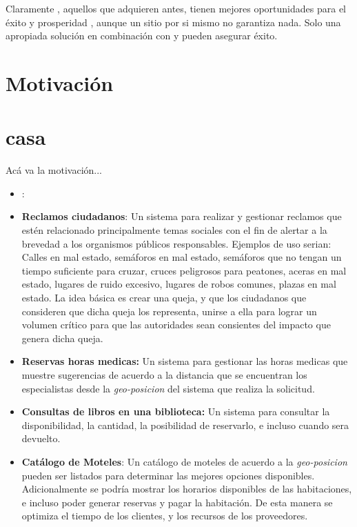 Claramente , aquellos que adquieren \estores antes, tienen mejores oportunidades  para el éxito y prosperidad , aunque un sitio \ecommerce por si mismo no garantiza nada. Solo una apropiada solución \ecommerce en combinación con \emarketing y \advertising pueden asegurar éxito.


\section{Motivación}\label{cap:intro:motivacion}
\section{casa}

Acá va la motivación...

\begin{itemize}
	\item \textbf{\shoppingcart}:
	
	\item \textbf{Reclamos ciudadanos}: Un sistema para realizar y gestionar reclamos que estén relacionado principalmente temas sociales con el fin de alertar a la brevedad a los organismos públicos responsables. Ejemplos de uso serian: Calles en mal estado, semáforos en mal estado, semáforos que no tengan un tiempo suficiente para cruzar, cruces peligrosos para peatones, aceras en mal estado, lugares de ruido excesivo, lugares de robos comunes, plazas en mal estado. La idea básica es crear una queja, y que los ciudadanos que consideren que dicha queja los representa, unirse a ella para lograr un volumen crítico para que las autoridades sean consientes del impacto que genera dicha queja.
	
	\item \textbf{Reservas horas medicas:} Un sistema para gestionar las horas medicas que muestre sugerencias de acuerdo a la distancia que se encuentran los especialistas desde la \textit{geo-posicion} del sistema que realiza la solicitud. 
	
	\item \textbf{Consultas de libros en una biblioteca:} Un sistema para consultar la disponibilidad, la cantidad, la posibilidad de reservarlo, e incluso cuando sera devuelto.
	\item \textbf{Catálogo de Moteles}: Un catálogo de moteles de acuerdo a la \textit{geo-posicion} pueden ser listados para determinar las mejores opciones disponibles. Adicionalmente se podría mostrar los horarios disponibles de las habitaciones, e incluso poder generar reservas y pagar la habitación. De esta manera se optimiza el tiempo de los clientes, y los recursos de los proveedores.
	

\end{itemize}
